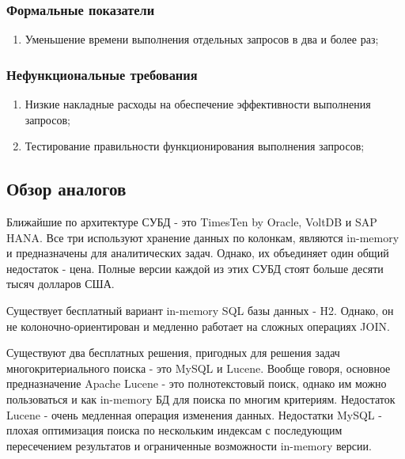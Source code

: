 \documentclass{matmex-diploma}
\begin{document}
        \subsubsection{Формальные показатели}
            \begin{enumerate} 
                \item Уменьшение времени выполнения отдельных запросов в два и более раз;
            \end{enumerate}
        \subsubsection{Нефункциональные требования}
            \begin{enumerate} 
                    \item Низкие накладные расходы на обеспечение эффективности выполнения запросов;
                    \item Тестирование правильности функционирования выполнения запросов;
            \end{enumerate}
    \subsection{Обзор аналогов}
        Ближайшие по архитектуре СУБД - это TimesTen by Oracle, VoltDB и SAP HANA. Все три используют хранение данных по колонкам, являются in-memory и предназначены для аналитических задач. Однако, их объединяет один общий недостаток - цена. Полные версии каждой из этих СУБД стоят больше десяти тысяч долларов США.
    
    Существует бесплатный вариант in-memory SQL базы данных - H2. Однако, он не колоночно-ориентирован и медленно работает на сложных операциях JOIN.
    
    Существуют два бесплатных решения, пригодных для решения задач многокритериального поиска - это MySQL и Lucene. Вообще говоря, основное предназначение Apache Lucene - это полнотекстовый поиск, однако им можно пользоваться и как in-memory БД для поиска по многим критериям. Недостаток Lucene - очень медленная операция изменения данных. Недостатки MySQL - плохая оптимизация поиска по нескольким индексам с последующим пересечением результатов и ограниченные возможности in-memory версии. 
    
\end{document}
